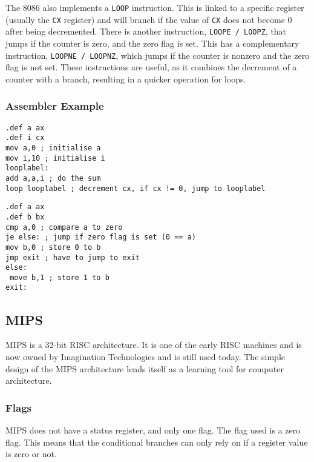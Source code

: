 \documentclass[12pt,a4paper]{article}
\begin{document}
\begin{bibunit}[is-unsrt]
The 8086 also implements a \texttt{LOOP} instruction.
This is linked to a specific register (usually the \texttt{CX} register) and will branch if the value of \texttt{CX} does not become $0$ after being decremented.
There is another instruction, \texttt{LOOPE / LOOPZ}, that jumps if the counter is zero, and the zero flag is set. 
This has a complementary instruction, \texttt{LOOPNE / LOOPNZ}, which jumps if the counter is nonzero and the zero flag is not set.
These instructions are useful, as it combines the decrement of a counter with a branch, resulting in a quicker operation for loops.


\subsubsection{Assembler Example}
\begin{lstlisting}[frame=single,caption=Intel 8086 assembler for listing \ref{ListC},label=intel1]
.def a ax
.def i cx
mov a,0 ; initialise a
mov i,10 ; initialise i
looplabel: 
add a,a,i ; do the sum
loop looplabel ; decrement cx, if cx != 0, jump to looplabel
\end{lstlisting}

\begin{lstlisting}[frame=single,caption=Intel 8086 assembler for listing \ref{ListC2},label=intel2]
.def a ax
.def b bx
cmp a,0 ; compare a to zero
je else: ; jump if zero flag is set (0 == a)
mov b,0 ; store 0 to b
jmp exit ; have to jump to exit
else:
 move b,1 ; store 1 to b
exit:

\end{lstlisting}


\subsection{MIPS}

MIPS is a 32-bit RISC architecture.
It is one of the early RISC machines and is now owned by Imagination Technologies and is still used today.
The simple design of the MIPS architecture lends itself as a learning tool for computer architecture.

\subsubsection{Flags}

MIPS does not have a status register, and only one flag.
The flag used is a zero flag. 
This means that the conditional branches can only rely on if a register value is zero or not.



\end{bibunit}
\end{document}
